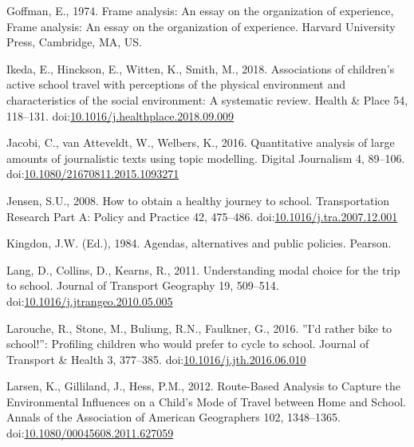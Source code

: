 \documentclass[]{elsarticle} %
\begin{document}
\leavevmode\hypertarget{ref-goffmanFrameAnalysisEssay1974}{}%
Goffman, E., 1974. Frame analysis: An essay on the organization of
experience, Frame analysis: An essay on the organization of experience.
Harvard University Press, Cambridge, MA, US.

\leavevmode\hypertarget{ref-ikedaAssociationsChildrenActive2018}{}%
Ikeda, E., Hinckson, E., Witten, K., Smith, M., 2018. Associations of
children's active school travel with perceptions of the physical
environment and characteristics of the social environment: A systematic
review. Health \& Place 54, 118--131.
doi:\href{https://doi.org/10.1016/j.healthplace.2018.09.009}{10.1016/j.healthplace.2018.09.009}

\leavevmode\hypertarget{ref-jacobiQuantitativeAnalysisLarge2016}{}%
Jacobi, C., van Atteveldt, W., Welbers, K., 2016. Quantitative analysis
of large amounts of journalistic texts using topic modelling. Digital
Journalism 4, 89--106.
doi:\href{https://doi.org/10.1080/21670811.2015.1093271}{10.1080/21670811.2015.1093271}

\leavevmode\hypertarget{ref-jensenHowObtainHealthy2008}{}%
Jensen, S.U., 2008. How to obtain a healthy journey to school.
Transportation Research Part A: Policy and Practice 42, 475--486.
doi:\href{https://doi.org/10.1016/j.tra.2007.12.001}{10.1016/j.tra.2007.12.001}

\leavevmode\hypertarget{ref-kingdonAgendasAlternativesPublic1984}{}%
Kingdon, J.W. (Ed.), 1984. Agendas, alternatives and public policies.
Pearson.

\leavevmode\hypertarget{ref-langUnderstandingModalChoice2011}{}%
Lang, D., Collins, D., Kearns, R., 2011. Understanding modal choice for
the trip to school. Journal of Transport Geography 19, 509--514.
doi:\href{https://doi.org/10.1016/j.jtrangeo.2010.05.005}{10.1016/j.jtrangeo.2010.05.005}

\leavevmode\hypertarget{ref-laroucheRatherBikeSchool2016}{}%
Larouche, R., Stone, M., Buliung, R.N., Faulkner, G., 2016. ''I'd rather
bike to school!'': Profiling children who would prefer to cycle to
school. Journal of Transport \& Health 3, 377--385.
doi:\href{https://doi.org/10.1016/j.jth.2016.06.010}{10.1016/j.jth.2016.06.010}

\leavevmode\hypertarget{ref-larsenRouteBasedAnalysisCapture2012}{}%
Larsen, K., Gilliland, J., Hess, P.M., 2012. Route-Based Analysis to
Capture the Environmental Influences on a Child's Mode of Travel between
Home and School. Annals of the Association of American Geographers 102,
1348--1365.
doi:\href{https://doi.org/10.1080/00045608.2011.627059}{10.1080/00045608.2011.627059}
\end{document}
